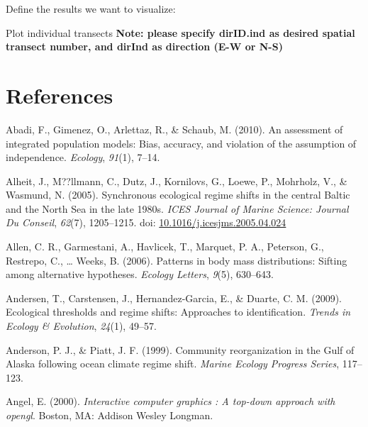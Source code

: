 \documentclass[12pt,twoside,openany]{reedthesis}
\begin{document}
Define the results we want to visualize:

Plot individual transects
\textbf{Note: please specify dirID.ind as desired spatial transect number, and dirInd as direction (E-W or N-S)}

\backmatter

\hypertarget{references}{%
\chapter*{References}\label{references}}


\noindent

\setlength{\parindent}{-0.20in}
\setlength{\leftskip}{0.20in}
\setlength{\parskip}{8pt}

\hypertarget{refs}{}
\leavevmode\hypertarget{ref-abadi2010assessment}{}%
Abadi, F., Gimenez, O., Arlettaz, R., \& Schaub, M. (2010). An assessment of integrated population models: Bias, accuracy, and violation of the assumption of independence. \emph{Ecology}, \emph{91}(1), 7--14.

\leavevmode\hypertarget{ref-alheit_synchronous_2005}{}%
Alheit, J., M??llmann, C., Dutz, J., Kornilovs, G., Loewe, P., Mohrholz, V., \& Wasmund, N. (2005). Synchronous ecological regime shifts in the central Baltic and the North Sea in the late 1980s. \emph{ICES Journal of Marine Science: Journal Du Conseil}, \emph{62}(7), 1205--1215. doi: \href{https://doi.org/10.1016/j.icesjms.2005.04.024}{10.1016/j.icesjms.2005.04.024}

\leavevmode\hypertarget{ref-allen2006patterns}{}%
Allen, C. R., Garmestani, A., Havlicek, T., Marquet, P. A., Peterson, G., Restrepo, C., \ldots{} Weeks, B. (2006). Patterns in body mass distributions: Sifting among alternative hypotheses. \emph{Ecology Letters}, \emph{9}(5), 630--643.

\leavevmode\hypertarget{ref-andersen_ecological_2009}{}%
Andersen, T., Carstensen, J., Hernandez-Garcia, E., \& Duarte, C. M. (2009). Ecological thresholds and regime shifts: Approaches to identification. \emph{Trends in Ecology \& Evolution}, \emph{24}(1), 49--57.

\leavevmode\hypertarget{ref-anderson_community_1999}{}%
Anderson, P. J., \& Piatt, J. F. (1999). Community reorganization in the Gulf of Alaska following ocean climate regime shift. \emph{Marine Ecology Progress Series}, 117--123.

\leavevmode\hypertarget{ref-angel2000}{}%
Angel, E. (2000). \emph{Interactive computer graphics : A top-down approach with opengl}. Boston, MA: Addison Wesley Longman.
\end{document}
